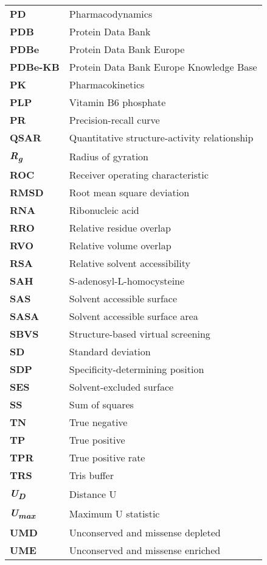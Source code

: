 \begin{longtable}[l]{@{}p{2.5cm}p{12cm}@{}}
\textbf{PD} & Pharmacodynamics \\ 
\textbf{PDB} & Protein Data Bank \\
\textbf{PDBe} & Protein Data Bank Europe \\
\textbf{PDBe-KB} & Protein Data Bank Europe Knowledge Base \\
\textbf{PK} & Pharmacokinetics \\
\textbf{PLP} & Vitamin B6 phosphate \\
\textbf{PR} & Precision-recall curve \\
\textbf{QSAR} & Quantitative structure-activity relationship \\
\textbf{\textit{R\textsubscript{g}}} & Radius of gyration \\
\textbf{ROC} & Receiver operating characteristic \\
\textbf{RMSD} & Root mean square deviation \\
\textbf{RNA} & Ribonucleic acid \\
\textbf{RRO} & Relative residue overlap \\
\textbf{RVO} & Relative volume overlap \\
\textbf{RSA} & Relative solvent accessibility \\
\textbf{SAH} & S-adenosyl-L-homocysteine \\
\textbf{SAS} & Solvent accessible surface \\
\textbf{SASA} & Solvent accessible surface area \\
\textbf{SBVS} & Structure-based virtual screening \\
\textbf{SD} & Standard deviation \\
\textbf{SDP} & Specificity-determining position \\
\textbf{SES} & Solvent-excluded surface \\
\textbf{SS} & Sum of squares \\
\textbf{TN} & True negative \\
\textbf{TP} & True positive \\
\textbf{TPR} & True positive rate \\
\textbf{TRS} & Tris buffer \\
\textbf{\textit{U\textsubscript{D}}} & Distance U \\
\textbf{\textit{U\textsubscript{max}}} & Maximum U statistic \\
\textbf{UMD} & Unconserved and missense depleted \\
\textbf{UME} & Unconserved and missense enriched \\

\end{longtable}
